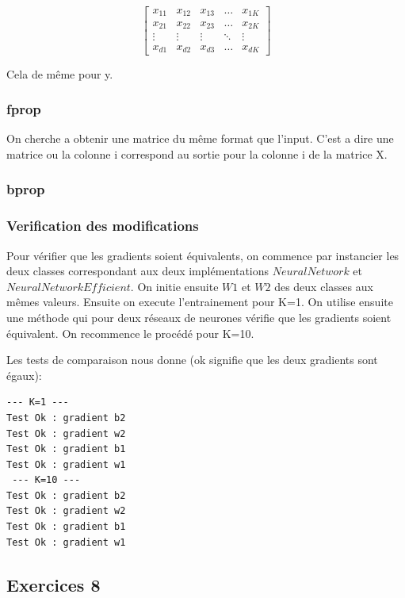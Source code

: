 \documentclass[a4paper,11pt]{article}
\begin{document}
\[
\begin{bmatrix}
    x_{11} & x_{12} & x_{13} & \dots  & x_{1K} \\
    x_{21} & x_{22} & x_{23} & \dots  & x_{2K} \\
    \vdots & \vdots & \vdots & \ddots & \vdots \\
    x_{d1} & x_{d2} & x_{d3} & \dots  & x_{dK}
\end{bmatrix}
\]

Cela de même pour y.

\subsubsection{fprop}

On cherche a obtenir une matrice du même format que l'input. C'est a dire une matrice ou la colonne i correspond au sortie pour la colonne i de la matrice X.

\subsubsection{bprop}


\subsubsection{Verification des modifications}
Pour vérifier que les gradients soient équivalents, on commence par instancier les deux classes correspondant aux deux implémentations $NeuralNetwork$ et $NeuralNetworkEfficient$. On initie ensuite $W1$ et $W2$ des deux classes aux mêmes valeurs. Ensuite on execute l'entrainement pour K=1. On utilise ensuite une méthode qui pour deux réseaux de neurones vérifie que les gradients soient équivalent. On recommence le procédé pour K=10.

Les tests de comparaison nous donne (ok signifie que les deux gradients sont égaux):

\begin{verbatim}
--- K=1 ---
Test Ok : gradient b2
Test Ok : gradient w2
Test Ok : gradient b1
Test Ok : gradient w1
 --- K=10 ---
Test Ok : gradient b2
Test Ok : gradient w2
Test Ok : gradient b1
Test Ok : gradient w1
\end{verbatim}


\subsection{Exercices 8}
\end{document}
